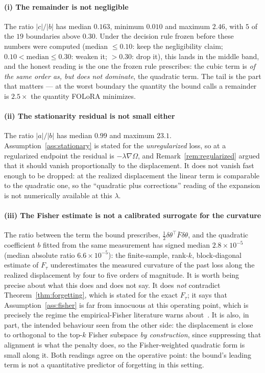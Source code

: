 \paragraph{(i) The remainder is not negligible}
The ratio $|c|/|b|$ has median $0.163$, minimum $0.010$ and maximum $2.46$, with $5$ of the
$19$ boundaries above $0.30$. Under the decision rule frozen before these numbers were
computed (median $\le 0.10$: keep the negligibility claim; $0.10<\text{median}\le 0.30$:
weaken it; $>0.30$: drop it), this lands in the middle band, and the honest reading is the
one the frozen rule prescribes: the cubic term is \emph{of the same order as, but does not
dominate}, the quadratic term. The tail is the part that matters --- at the worst boundary
the quantity the bound calls a remainder is $2.5\times$ the quantity FOLoRA minimizes.

\paragraph{(ii) The stationarity residual is not small either}
The ratio $|a|/|b|$ has median $0.99$ and maximum $23.1$.
Assumption~\ref{ass:stationary} is stated for the \emph{unregularized} loss, so at a
regularized endpoint the residual is $-\lambda\nabla\Omega$, and
Remark~\ref{rem:regularized} argued that it should vanish proportionally to the
displacement. It does not vanish fast enough to be dropped: at the realized displacement
the linear term is comparable to the quadratic one, so the ``quadratic plus corrections''
reading of the expansion is not numerically available at this $\lambda$.

\paragraph{(iii) The Fisher estimate is not a calibrated surrogate for the curvature}
The ratio between the term the bound prescribes, $\frac12\delta\theta^{\!\top}\bar{F}\delta\theta$,
and the quadratic coefficient $b$ fitted from the same measurement has signed median
$2.8\times10^{-5}$ (median absolute ratio $6.6\times10^{-5}$): the finite-sample, rank-$k$,
block-diagonal estimate of $F_\tau$
underestimates the measured curvature of the past loss along the realized displacement by
four to five orders of magnitude.
It is worth being precise about what this does and does not say. It does \emph{not}
contradict Theorem~\ref{thm:forgetting}, which is stated for the exact $F_\tau$; it says
that Assumption~\ref{ass:fisher} is far from innocuous at this operating point, which is
precisely the regime the empirical-Fisher literature warns about~\cite{kunstner2019limitations}.
It is also, in part, the intended behaviour seen from the other side: the displacement is
close to orthogonal to the top-$k$ Fisher subspace \emph{by construction}, since suppressing
that alignment is what the penalty does, so the Fisher-weighted quadratic form is small
along it. Both readings agree on the operative point: the bound's leading term is not a
quantitative predictor of forgetting in this setting.

